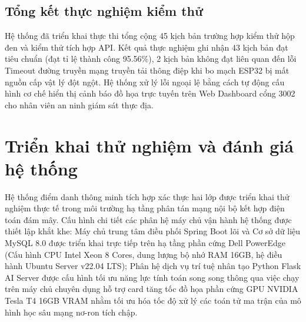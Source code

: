 ﻿\documentclass[../DoAn.tex]{subfiles}
\begin{document}
\subsection{Tổng kết thực nghiệm kiểm thử}

Hệ thống đã triển khai thực thi tổng cộng 45 kịch bản trường hợp kiểm thử hộp đen và kiểm thử tích hợp API. Kết quả thực nghiệm ghi nhận 43 kịch bản đạt tiêu chuẩn (đạt tỉ lệ thành công 95.56\%), 2 kịch bản không đạt liên quan đến lỗi Timeout đường truyền mạng truyền tải thông điệp khi bo mạch ESP32 bị mất nguồn cấp vật lý đột ngột. Hệ thống xử lý lỗi ngoại lệ bằng cách tự động cấu hình cơ chế hiển thị cảnh báo đồ họa trực tuyến trên Web Dashboard cổng 3002 cho nhân viên an ninh giám sát thực địa.

\section{Triển khai thử nghiệm và đánh giá hệ thống}
\label{section:4.5}

Hệ thống điểm danh thông minh tích hợp xác thực hai lớp được triển khai thử nghiệm thực tế trong môi trường hạ tầng phân tán mạng nội bộ kết hợp điện toán đám mây. Cấu hình chi tiết các phân hệ máy chủ vận hành hệ thống được thiết lập khắt khe: Máy chủ trung tâm điều phối Spring Boot lõi và Cơ sở dữ liệu MySQL 8.0 được triển khai trực tiếp trên hạ tầng phần cứng Dell PowerEdge (Cấu hình CPU Intel Xeon 8 Cores, dung lượng bộ nhớ RAM 16GB, hệ điều hành Ubuntu Server v22.04 LTS); Phân hệ dịch vụ trí tuệ nhân tạo Python Flask AI Server được cấu hình tối ưu năng lực tính toán song song thông qua việc chạy trên máy chủ chuyên dụng hỗ trợ card tăng tốc đồ họa phần cứng GPU NVIDIA Tesla T4 16GB VRAM nhằm tối ưu hóa tốc độ xử lý các toán tử ma trận của mô hình học sâu mạng nơ-ron tích chập.
\end{document}
